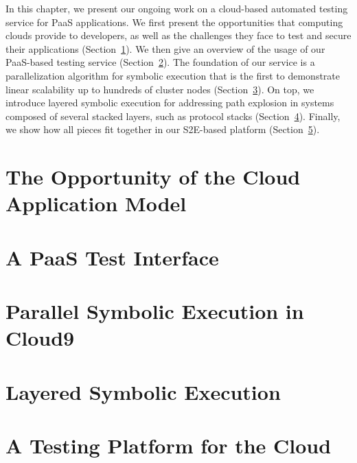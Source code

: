 In this chapter, we present our ongoing work on a cloud-based automated testing service for PaaS applications.
%
We first present the opportunities that computing clouds provide to developers, as well as the challenges they face to test and secure their applications (Section~\ref{sec:paas:opportunity}).
%
We then give an overview of the usage of our PaaS-based testing service (Section~\ref{sec:paas:abstractions}).
%
The foundation of our service is a parallelization algorithm for symbolic execution that is the first to demonstrate linear scalability up to hundreds of cluster nodes (Section~\ref{sec:paas:parsymbex}).
%
On top, we introduce layered symbolic execution for addressing path explosion in systems composed of several stacked layers, such as protocol stacks (Section~\ref{sec:paas:layeredsymbex}).
%
Finally, we show how all pieces fit together in our S2E-based platform (Section~\ref{sec:paas:fedsymbex}).

\section{The Opportunity of the Cloud Application Model}
\label{sec:paas:opportunity}


\section{A PaaS Test Interface}
\label{sec:paas:abstractions}


\section{Parallel Symbolic Execution in Cloud9}
\label{sec:paas:parsymbex}


\section{Layered Symbolic Execution}
\label{sec:paas:layeredsymbex}


\section{A Testing Platform for the Cloud}
\label{sec:paas:fedsymbex}





